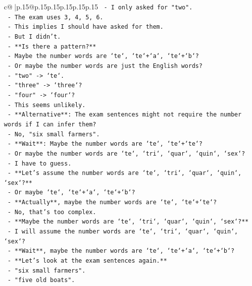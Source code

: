 \documentclass{article}
\begin{document}
{\begin{supertabular}{c@{$\;$}|p{.15\linewidth}@{}p{.15\linewidth}p{.15\linewidth}p{.15\linewidth}p{.15\linewidth}p{.15\linewidth}}
{{{\texttt{    {-} I only asked for "two".} \\
\texttt{    {-} The exam uses 3, 4, 5, 6.} \\
\texttt{    {-} This implies I should have asked for them.} \\
\texttt{    {-} But I didn't.} \\
\texttt{    {-} **Is there a pattern?**} \\
\texttt{    {-} Maybe the number words are `te`, `te`+`a`, `te`+`b`?} \\
\texttt{    {-} Or maybe the number words are just the English words?} \\
\texttt{    {-} "two" {-}> `te`.} \\
\texttt{    {-} "three" {-}> `three`?} \\
\texttt{    {-} "four" {-}> `four`?} \\
\texttt{    {-} This seems unlikely.} \\
\texttt{    {-} **Alternative**: The exam sentences might not require the number words if I can infer them?} \\
\texttt{    {-} No, "six small farmers".} \\
\texttt{    {-} **Wait**: Maybe the number words are `te`, `te`+`te`?} \\
\texttt{    {-} Or maybe the number words are `te`, `tri`, `quar`, `quin`, `sex`?} \\
\texttt{    {-} I have to guess.} \\
\texttt{    {-} **Let's assume the number words are `te`, `tri`, `quar`, `quin`, `sex`?**} \\
\texttt{    {-} Or maybe `te`, `te`+`a`, `te`+`b`?} \\
\texttt{    {-} **Actually**, maybe the number words are `te`, `te`+`te`?} \\
\texttt{    {-} No, that's too complex.} \\
\texttt{    {-} **Maybe the number words are `te`, `tri`, `quar`, `quin`, `sex`?**} \\
\texttt{    {-} I will assume the number words are `te`, `tri`, `quar`, `quin`, `sex`?} \\
\texttt{    {-} **Wait**, maybe the number words are `te`, `te`+`a`, `te`+`b`?} \\
\texttt{    {-} **Let's look at the exam sentences again.**} \\
\texttt{    {-} "six small farmers".} \\
\texttt{    {-} "five old boats".} \\
}}}
\end{supertabular}}
\end{document}
